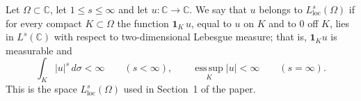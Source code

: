 \begin{definition}
Let $\Omega\subset\mathbb{C}$, let $1\le s\le\infty$ and let
$u\colon\mathbb{C}\to\mathbb{C}$.  We say that $u$ belongs to
$L^s_{\mathrm{loc}}(\Omega)$ if for every compact $K\subset\Omega$ the
function $\mathbf{1}_K\,u$, equal to $u$ on $K$ and to $0$ off $K$, lies in
$L^s(\mathbb{C})$ with respect to two-dimensional Lebesgue measure; that is,
$\mathbf{1}_K u$ is measurable and
\[
  \int_{K}|u|^s\,d\sigma<\infty\qquad(s<\infty),
  \qquad
  \operatorname*{ess\,sup}_{K}|u|<\infty\qquad(s=\infty).
\]
This is the space $L^s_{\mathrm{loc}}(\Omega)$ used in Section~1 of the paper.
\end{definition}

